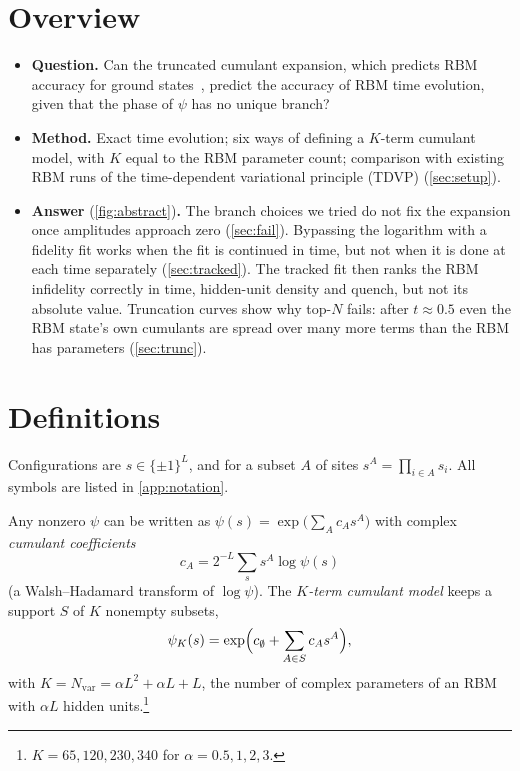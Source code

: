 \documentclass[11pt,a4paper]{article}
\begin{document}
\section*{Overview}
\begin{itemize}
  \item \textbf{Question.} Can the truncated cumulant expansion, which predicts RBM accuracy for ground states~\cite{Cortes25}, predict the accuracy of RBM time evolution, given that the phase of $\psi$ has no unique branch?
  \item \textbf{Method.} Exact time evolution; six ways of defining a $K$-term cumulant model, with $K$ equal to the RBM parameter count; comparison with existing RBM runs of the time-dependent variational principle (TDVP) (\cref{sec:setup}).
  \item \textbf{Answer} (\cref{fig:abstract})\textbf{.} The branch choices we tried do not fix the expansion once amplitudes approach zero (\cref{sec:fail}). Bypassing the logarithm with a fidelity fit works when the fit is continued in time, but not when it is done at each time separately (\cref{sec:tracked}). The tracked fit then ranks the RBM infidelity correctly in time, hidden-unit density and quench, but not its absolute value. Truncation curves show why top-$N$ fails: after $t\approx0.5$ even the RBM state's own cumulants are spread over many more terms than the RBM has parameters (\cref{sec:trunc}).
\end{itemize}

\section{Definitions}\label{sec:defs}
Configurations are $s\in\{\pm1\}^L$, and for a subset $A$ of sites $s^A=\prod_{i\in A}s_i$. All symbols are listed in \cref{app:notation}.

\begin{definition}
Any nonzero $\psi$ can be written as $\psi(s)=\exp\bigl(\sum_A c_A s^A\bigr)$ with complex \emph{cumulant coefficients}
\[
  c_A=2^{-L}\sum_s s^A\log\psi(s)
\]
(a Walsh--Hadamard transform of $\log\psi$). The \emph{$K$-term cumulant model} keeps a support $S$ of $K$ nonempty subsets,
\[
  \psi_K(s)=\exp\Bigl(c_\emptyset+\sum_{A\in S}c_A s^A\Bigr),
\]
with $K=N_\mathrm{var}=\alpha L^2+\alpha L+L$, the number of complex parameters of an RBM with $\alpha L$ hidden units.\footnote{$K=65,120,230,340$ for $\alpha=0.5,1,2,3$.}
\end{definition}
\end{document}
